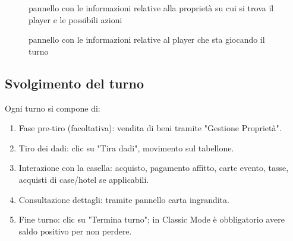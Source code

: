 \begin{figure}[H]
    \centering
    \caption{pannello con le informazioni relative alla proprietà su cui si trova il player e le possibili azioni}
	\label{img:gamescreen}
\end{figure}
\begin{figure}[H]
    \centering
    \caption{pannello con le informazioni relative al player che sta giocando il turno}
	\label{img:gamescreen}
\end{figure}
\subsection{Svolgimento del turno}
Ogni turno si compone di:
\begin{enumerate}
    \item Fase pre-tiro (facoltativa): vendita di beni tramite "Gestione Proprietà".
    \item Tiro dei dadi: clic su "Tira dadi", movimento sul tabellone.
    \item Interazione con la casella: acquisto, pagamento affitto, carte evento, tasse, acquisti di case/hotel se applicabili.
    \item Consultazione dettagli: tramite pannello carta ingrandita.
    \item Fine turno: clic su "Termina turno"; in Classic Mode è obbligatorio avere saldo positivo per non perdere.
\end{enumerate}
